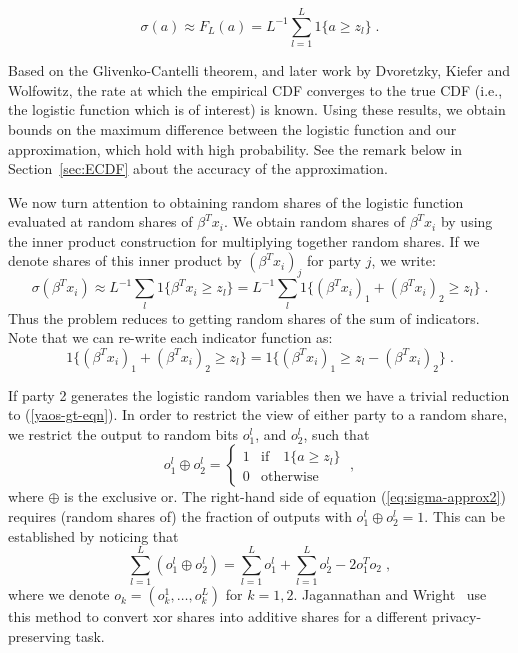 \documentclass[11pt]{article}
\begin{document}
\begin{equation}\label{sigma-appox}
\sigma(a) \approx F_L(a) = L^{-1}\sum_{l=1}^L{1\{a \geq z_l\}} \; .
\end{equation}

Based on the Glivenko-Cantelli theorem, and later work by Dvoretzky, Kiefer and Wolfowitz, the rate at which the empirical CDF converges to the true CDF (i.e., the logistic function which is of interest) is known.  Using these results, we  obtain bounds on the maximum difference between the logistic function and our approximation, which hold with high probability.  See the remark below in Section~\ref{sec:ECDF} about the accuracy of the approximation.

We now turn attention to obtaining random shares of the logistic function evaluated at random shares of $\beta^Tx_i$.  We obtain random shares of $\beta^Tx_i$ by using the inner product construction for multiplying together random shares.  If we denote shares of this inner product by $(\beta^Tx_i)_j$ for party $j$, we  write:
\begin{equation} \label{eq:sigma-approx2}
\sigma(\beta^Tx_i) \approx L^{-1}\sum_l{1\{\beta^Tx_i \geq z_l\}} = L^{-1}\sum_l{1\{(\beta^Tx_i)_1 + (\beta^Tx_i)_2 \geq z_l\}} \; .
\end{equation}
Thus the problem reduces to getting random shares of the sum of indicators.   Note that we can re-write each indicator function as:
\begin{equation} \label{gt-shares}
1\{(\beta^Tx_i)_1 + (\beta^Tx_i)_2 \geq z_l\} = 1\{(\beta^Tx_i)_1 \geq z_l - (\beta^Tx_i)_2 \} \; .
\end{equation}

\noindent If party 2 generates the logistic random variables then we have a trivial reduction to (\ref{yaos-gt-eqn}).  In order to restrict the view of either party to a random share, we restrict the output to random bits $o^l_1$, and $o^l_2$, such that
\[
o^l_1\oplus o^l_2 = \left\{
\begin{array}{cc}
1 & \mbox{if} \quad 1\{a\geq z_l\}   \\
0 & \mbox{otherwise}
\end{array}\right. \; ,
\]
where $\oplus$ is the exclusive or. The right-hand side of equation (\ref{eq:sigma-approx2}) requires (random shares of) the fraction of outputs with $o^l_1\oplus o^l_2=1$. This can be established by noticing that
\[
\sum_{l=1}^L (o^l_1\oplus o^l_2)=\sum_{l=1}^L o^l_1+\sum_{l=1}^L o^l_2-2o_1^To_2 \; ,
\]
where we denote $o_k=(o^1_k, \ldots, o^L_k)$ for $k=1,2$. Jagannathan and Wright~\cite{jagannathan} use this method to convert xor shares into additive shares for a different privacy-preserving task.
\end{document}
